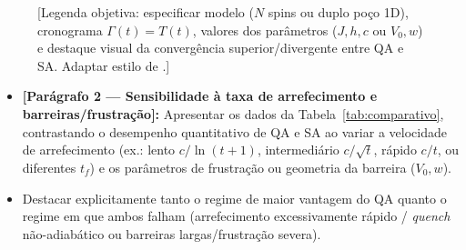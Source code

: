 \documentclass[aps,pre,twocolumn,10pt,superscriptaddress,nofootinbib]{revtex4-2}
\begin{document}
\begin{figure}[t]
  \centering
  \caption{[Legenda objetiva: especificar modelo ($N$ spins ou duplo poço 1D), cronograma $\Gamma(t)=T(t)$, valores dos parâmetros ($J, h, c$ ou $V_0, w$) e destaque visual da convergência superior/divergente entre QA e SA. Adaptar estilo de \cite{Kadowaki1998}.]}
  \label{fig:pgs_evolucao}
\end{figure}

\begin{itemize}
  \item \textbf{[Parágrafo 2 --- Sensibilidade à taxa de arrefecimento e barreiras/frustração]:}
        Apresentar os dados da Tabela~\ref{tab:comparativo}, contrastando o desempenho quantitativo de QA e SA ao variar a velocidade de arrefecimento (ex.: lento $c/\ln(t+1)$, intermediário $c/\sqrt{t}$, rápido $c/t$, ou diferentes $t_f$) e os parâmetros de frustração ou geometria da barreira ($V_0, w$).
  \item Destacar explicitamente tanto o regime de maior vantagem do QA quanto o regime em que ambos falham (arrefecimento excessivamente rápido / \emph{quench} não-adiabático ou barreiras largas/frustração severa).
\end{itemize}
\end{document}
